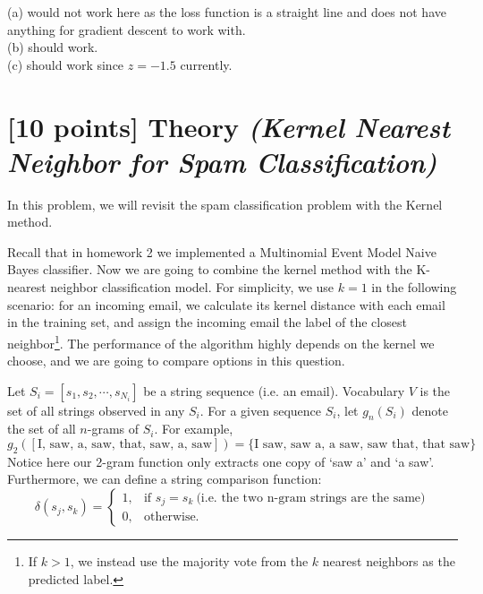 \documentclass{article}
\begin{document}
\begin{enumerate}
{(a) would not work here as the loss function is a straight line and does not have anything for gradient descent to work with. \\
(b) should work. \\
(c) should work since $z = -1.5$ currently. \\

}

\end{enumerate}

\clearpage

\section{[10 points] Theory \it{(Kernel Nearest Neighbor for Spam Classification)}}

In this problem, we will revisit the spam classification problem with the Kernel method. 

Recall that in homework 2 we implemented a Multinomial Event Model Naive Bayes classifier. Now we are going to combine the kernel method with the  K-nearest neighbor classification model. For simplicity, we use $k=1$ in the following scenario: for an incoming email, we calculate its kernel distance with each email in the training set, and assign the incoming email the label of the closest neighbor\footnote{If $k > 1$, we instead use the majority vote from the $k$ nearest neighbors as the predicted label.}. The performance of the algorithm highly depends on the kernel we choose, and we are going to compare options in this question.  

Let $S_i = [s_1, s_2, \cdots, s_{N_i}]$ be a string sequence (i.e. an email). Vocabulary $V$ is the set of all strings observed in any $S_i$. For a given sequence $S_i$, let $g_n(S_i)$ denote the set of all $n$-grams of $S_i$. For example,
    $$
        g_2([\text{I, saw, a, saw, that, saw, a, saw} ]) = \{\text{I saw},\,\text{saw a},\,\text{a saw},\,\text{saw that},\,\text{that saw}\}
    $$
    Notice here our 2-gram function only extracts one copy of `saw a' and `a saw'. Furthermore, we can define a string comparison function: 
\[
    \delta(s_j, s_k) =
\begin{cases}
  1,& \text{if } s_j = s_k\ \text{(i.e. the two n-gram strings are the same)}\\
    0,& \text{otherwise.}
\end{cases}
\]
\end{document}
